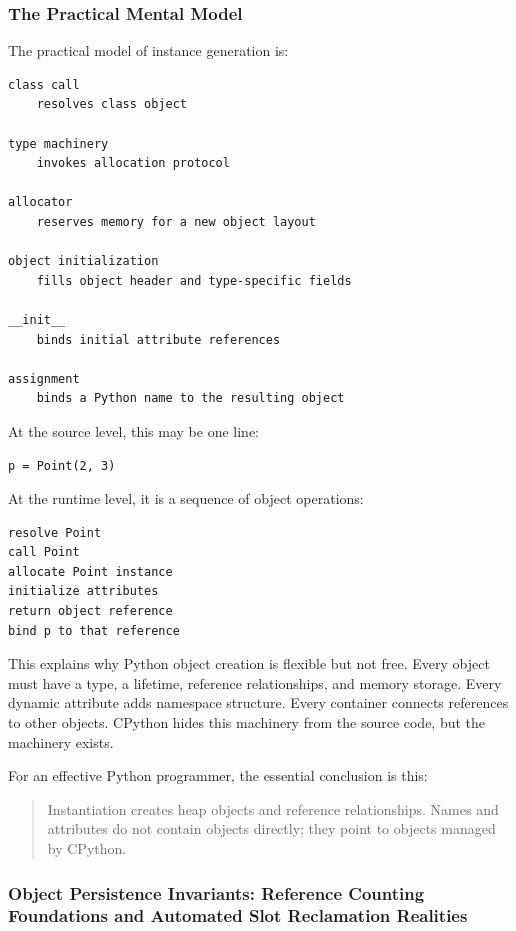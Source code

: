\subsubsection*{The Practical Mental Model}

The practical model of instance generation is:

\begin{verbatim}
class call
    resolves class object

type machinery
    invokes allocation protocol

allocator
    reserves memory for a new object layout

object initialization
    fills object header and type-specific fields

__init__
    binds initial attribute references

assignment
    binds a Python name to the resulting object
\end{verbatim}

At the source level, this may be one line:

\begin{verbatim}
p = Point(2, 3)
\end{verbatim}

At the runtime level, it is a sequence of object operations:

\begin{verbatim}
resolve Point
call Point
allocate Point instance
initialize attributes
return object reference
bind p to that reference
\end{verbatim}

This explains why Python object creation is flexible but not free. Every object must have a type, a lifetime, reference relationships, and memory storage. Every dynamic attribute adds namespace structure. Every container connects references to other objects. CPython hides this machinery from the source code, but the machinery exists.

For an effective Python programmer, the essential conclusion is this:

\begin{quote}
Instantiation creates heap objects and reference relationships. Names and attributes do not contain objects directly; they point to objects managed by CPython.
\end{quote}


\subsubsection{Object Persistence Invariants: Reference Counting Foundations and Automated Slot Reclamation Realities}

